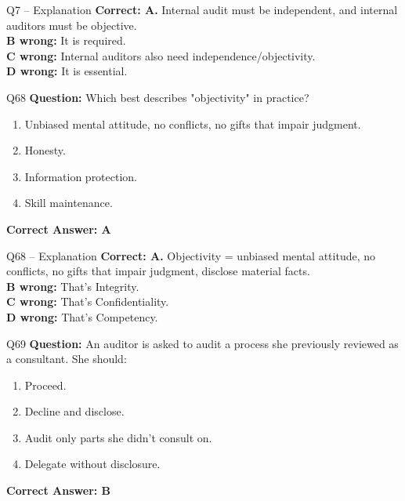 \documentclass[aspectratio=169,10pt]{beamer}
\begin{document}
	\begin{frame}[t]{Q7 -- Explanation}
		\small
		\textbf{Correct: A.} Internal audit must be independent, and internal auditors must be objective. \\[4pt]
		\textbf{B wrong:} It is required. \\[2pt]
		\textbf{C wrong:} Internal auditors also need independence/objectivity. \\[2pt]
		\textbf{D wrong:} It is essential.
	\end{frame}
	
	\begin{frame}[t]{Q68}
		\small
		\textbf{Question:} Which best describes "objectivity" in practice?
		\begin{enumerate}[label=\Alph*.,itemsep=1pt,topsep=2pt]
			\item Unbiased mental attitude, no conflicts, no gifts that impair judgment.
			\item Honesty.
			\item Information protection.
			\item Skill maintenance.
		\end{enumerate}
		\vspace{4pt}
		\textbf{Correct Answer: A}
	\end{frame}
	
	\begin{frame}[t]{Q68 -- Explanation}
		\small
		\textbf{Correct: A.} Objectivity = unbiased mental attitude, no conflicts, no gifts that impair judgment, disclose material facts. \\[4pt]
		\textbf{B wrong:} That's Integrity. \\[2pt]
		\textbf{C wrong:} That's Confidentiality. \\[2pt]
		\textbf{D wrong:} That's Competency.
	\end{frame}
	
	\begin{frame}[t]{Q69}
		\small
		\textbf{Question:} An auditor is asked to audit a process she previously reviewed as a consultant. She should:
		\begin{enumerate}[label=\Alph*.,itemsep=1pt,topsep=2pt]
			\item Proceed.
			\item Decline and disclose.
			\item Audit only parts she didn't consult on.
			\item Delegate without disclosure.
		\end{enumerate}
		\vspace{4pt}
		\textbf{Correct Answer: B}
	\end{frame}
	
\end{document}

